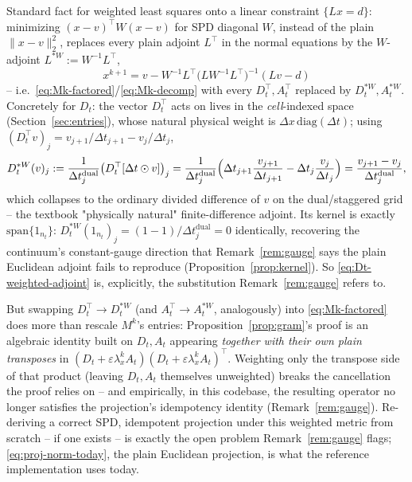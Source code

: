\documentclass[11pt]{article}
\newcommand{\eps}{\varepsilon}
\newcommand{\dt}{\Delta t}
\newcommand{\dx}{\Delta x}
\newcommand{\lx}{\lambda_x^k}
\begin{document}
Standard fact for weighted least squares onto a linear constraint $\{Lx=d\}$: minimizing
$(x-v)^\top W(x-v)$ for SPD diagonal $W$, instead of the plain $\|x-v\|_2^2$, replaces every plain
adjoint $L^\top$ in the normal equations by the $W$-adjoint $L^{*W}:=W^{-1}L^\top$,
\begin{equation}
  x^{k+1} = v - W^{-1}L^\top\bigl(LW^{-1}L^\top\bigr)^{-1}(Lv-d)
\end{equation}
-- i.e.\ \eqref{eq:Mk-factored}/\eqref{eq:Mk-decomp} with every $D_t^\top,A_t^\top$ replaced by
$D_t^{*W}, A_t^{*W}$. Concretely for $D_t$: the vector $D_t^\top$ acts on lives in the
\emph{cell}-indexed space (Section~\ref{sec:entries}), whose natural physical weight is
$\dx\,\mathrm{diag}(\dt)$; using $(D_t^\top v)_j = v_{j+1}/\dt_{j+1}-v_j/\dt_j$,
\begin{equation}
  \label{eq:Dt-weighted-adjoint}
  D_t^{*W}(v)_j := \frac{1}{\dt_j^{\mathrm{dual}}}\bigl(D_t^\top[\dt\odot v]\bigr)_j
  = \frac{1}{\dt_j^{\mathrm{dual}}}\Bigl(\dt_{j+1}\frac{v_{j+1}}{\dt_{j+1}} - \dt_j\frac{v_j}{\dt_j}\Bigr)
  = \frac{v_{j+1}-v_j}{\dt_j^{\mathrm{dual}}},
\end{equation}
which collapses to the ordinary divided difference of $v$ on the dual/staggered grid -- the
textbook "physically natural" finite-difference adjoint. Its kernel is exactly $\mathrm{span}\{1_{n_t}\}$:
$D_t^{*W}(1_{n_t})_j = (1-1)/\dt_j^{\mathrm{dual}}=0$ identically, recovering the continuum's
constant-gauge direction that Remark~\ref{rem:gauge} says the plain Euclidean adjoint fails to
reproduce (Proposition~\ref{prop:kernel}). So \eqref{eq:Dt-weighted-adjoint} is, explicitly, the
substitution Remark~\ref{rem:gauge} refers to.

But swapping $D_t^\top\to D_t^{*W}$ (and $A_t^\top\to A_t^{*W}$, analogously) into
\eqref{eq:Mk-factored} does more than rescale $M^k$'s entries: Proposition~\ref{prop:gram}'s proof
is an algebraic identity built on $D_t,A_t$ appearing \emph{together with their own plain
transposes} in $(D_t+\eps\lx A_t)(D_t+\eps\lx A_t)^\top$. Weighting only the transpose side of
that product (leaving $D_t,A_t$ themselves unweighted) breaks the cancellation the proof relies
on -- and empirically, in this codebase, the resulting operator no longer satisfies the
projection's idempotency identity (Remark~\ref{rem:gauge}). Re-deriving a correct SPD, idempotent
projection under this weighted metric from scratch -- if one exists -- is exactly the open problem
Remark~\ref{rem:gauge} flags; \eqref{eq:proj-norm-today}, the plain Euclidean projection, is what
the reference implementation uses today.
\end{document}
